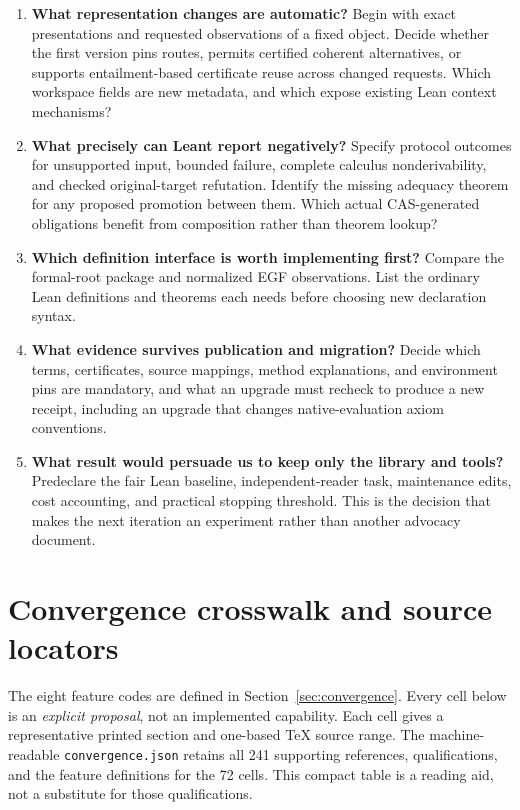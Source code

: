 \documentclass[11pt,letterpaper]{article}
\newcommand{\code}[1]{\nolinkurl{#1}}
\begin{document}
\begin{enumerate}[label=\textbf{Q\arabic*.},itemsep=.7em]
\item \textbf{What representation changes are automatic?} Begin with exact
presentations and requested observations of a fixed object. Decide whether the
first version pins routes, permits certified coherent alternatives, or supports
entailment-based certificate reuse across changed requests. Which workspace
fields are new metadata, and which expose existing Lean context mechanisms?

\item \textbf{What precisely can Leant report negatively?} Specify protocol
outcomes for unsupported input, bounded failure, complete calculus
nonderivability, and checked original-target refutation. Identify the missing
adequacy theorem for any proposed promotion between them. Which actual
CAS-generated obligations benefit from composition rather than theorem lookup?

\item \textbf{Which definition interface is worth implementing first?} Compare
the formal-root package and normalized EGF observations. List the ordinary Lean
definitions and theorems each needs before choosing new declaration syntax.

\item \textbf{What evidence survives publication and migration?} Decide which
terms, certificates, source mappings, method explanations, and environment pins
are mandatory, and what an upgrade must recheck to produce a new receipt,
including an upgrade that changes native-evaluation axiom conventions.

\item \textbf{What result would persuade us to keep only the library and tools?}
Predeclare the fair Lean baseline, independent-reader task, maintenance edits,
cost accounting, and practical stopping threshold. This is the decision that
makes the next iteration an experiment rather than another advocacy document.
\end{enumerate}

\clearpage
\appendix
\section{Convergence crosswalk and source locators}\label{app:crosswalk}
The eight feature codes are defined in Section~\ref{sec:convergence}. Every cell
below is an \emph{explicit proposal}, not an implemented capability. Each cell
gives a representative printed section and one-based TeX source range. The
machine-readable \code{convergence.json} retains all 241 supporting references,
qualifications, and the feature definitions for the 72 cells. This compact table
is a reading aid, not a substitute for those qualifications.
\end{document}
